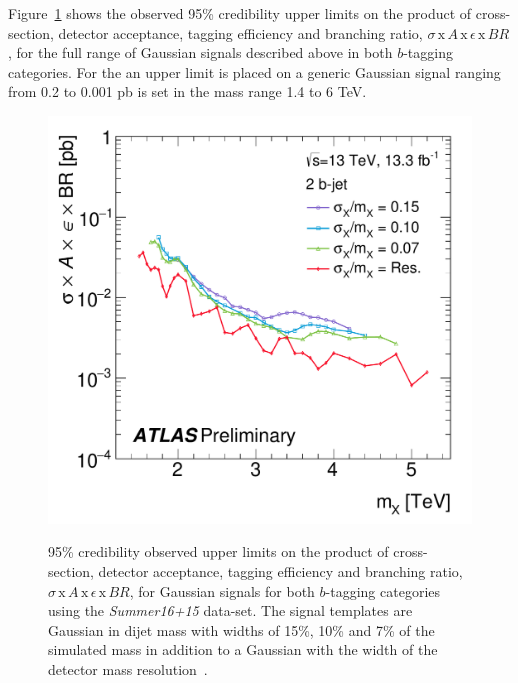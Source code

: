 Figure~\ref{fig:lim-summer_gauss} shows the observed 95\% credibility upper limits
on the product of cross-section, detector acceptance, tagging efficiency and branching ratio,
$\sigma\,\text{x}\,\mathit{A}\,\text{x}\,\epsilon\,\text{x}\,\mathit{BR}$,
for the full range of Gaussian signals described above in both $b$-tagging categories.
For the \summer{} an upper limit is placed on a generic Gaussian signal
ranging from 0.2 to 0.001 pb is set in the mass range 1.4 to 6 TeV.

\begin{figure}[!ht]
  \begin{center}
    \captionsetup[subfigure]{aboveskip=0pt,justification=centering}
         {\includegraphics[width=0.47\linewidth, angle=0]{figs/Dibjet/ICHEP/lim-summer_gauss_bb.pdf}}
  \end{center}
  \caption[95\% credibility observed upper limits
    on the product of cross-section, detector acceptance, tagging efficiency and branching ratio,
    $\sigma\,\text{x}\,\mathit{A}\,\text{x}\,\epsilon\,\text{x}\,\mathit{BR}$,
    for Gaussian signals for both $b$-tagging categories using the \textit{Summer16+15} data-set.
    The Gaussian widths considered are 15\%, 10\% and 7\% of the simulated mass
    in addition to a Gaussian with the width of the detector mass resolution.]
  {95\% credibility observed upper limits
    on the product of cross-section, detector acceptance, tagging efficiency and branching ratio,
    $\sigma\,\text{x}\,\mathit{A}\,\text{x}\,\epsilon\,\text{x}\,\mathit{BR}$,
    for Gaussian signals for both $b$-tagging categories using the \textit{Summer16+15} data-set.
    The signal templates are Gaussian in dijet  mass with
    widths of 15\%, 10\% and 7\% of the simulated mass
    in addition to a Gaussian with the width of the detector mass resolution~\cite{dibjet-ichep_conf}.
  }
  \label{fig:lim-summer_gauss}
\end{figure}

